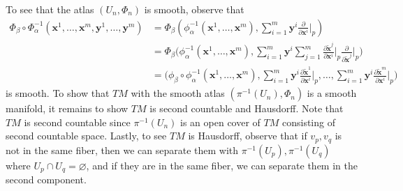 \documentclass{report}
\begin{document}
\begin{mdframed}
To see that the atlas $(U_n,\Phi_n)$ is smooth, observe that 
\begin{align*}
\Phi_\beta \circ \Phi^{-1}_\alpha (\textbf{x}^1,\dots ,\textbf{x}^m ,\textbf{y}^1,\dots ,\textbf{y}^m)&= \Phi_\beta (\phi_\alpha ^{-1}(\textbf{x}^1,\dots ,\textbf{x}^m),\sum_{i=1}^m \textbf{y}^i \frac{\partial }{\partial \textbf{x}^i}\Big|_p)\\
&=\Phi_\beta \Big(\phi_\alpha ^{-1}(\textbf{x}^1,\dots ,\textbf{x}^m),\sum_{i=1}^m \textbf{y}^i \sum_{j=1}^m \frac{\partial \tilde{\textbf{x}}^j}{\partial  \textbf{x}^i}\Big|_p \frac{\partial }{\partial \tilde{\textbf{x}}^j}\Big|_p\Big)\\
&=\Big(\phi_\beta  \circ \phi^{-1}_\alpha (\textbf{x}^1,\dots ,\textbf{x}^m),\sum_{i=1}^m \textbf{y}^i \frac{\partial \tilde{\textbf{x}} ^1 }{\partial \textbf{x}^i}\Big|_p, \dots , \sum_{i=1}^m \textbf{y}^i \frac{\partial \tilde{\textbf{x}}^m }{\partial \textbf{x}^i}\Big|_p  \Big)
\end{align*}
is smooth. To show that $TM$ with the smooth atlas  $(\pi^{-1}(U_n),\Phi_n)$ is a smooth manifold, it remains to show $TM$ is second countable and Hausdorff. Note that $TM$ is second countable since  $\pi^{-1}(U_n)$ is an open cover of $TM$ consisting of second countable space. Lastly, to see $TM$ is Hausdorff, observe that if $v_p,v_q$ is not in the same fiber, then we can separate them with $\pi^{-1}(U_p),\pi^{-1}(U_q)$ where $U_p\cap U_q=\varnothing$, and if they are in the same fiber, we can separate them in the second component. \\




\end{mdframed}
\end{document}
